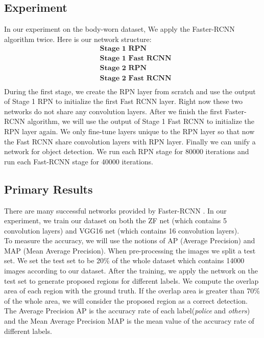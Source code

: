 \documentclass[a4paper]{article}
\begin{document}
\subsection{Experiment}
In our experiment on the body-worn dataset, We apply the Faster-RCNN \cite{fasterrcnn} algorithm twice. Here is our network structure:
\begin{align*}
& \textbf{Stage 1 RPN}\\
& \textbf{Stage 1 Fast RCNN}\\
&\textbf{Stage 2 RPN}\\
& \textbf{Stage 2 Fast RCNN}\\
\end{align*}
During the first stage, we create the RPN layer from scratch and use the output of Stage 1 RPN to initialize the first Fast RCNN layer. Right now these two networks do not share any convolution layers. After we finish the first Faster-RCNN algorithm, we will use the output of Stage 1 Fast RCNN to initialize the RPN layer again. We only fine-tune layers unique to the RPN layer so that now the Fast RCNN share convolution layers with RPN layer. Finally we can unify a network for object detection. We run each RPN stage for 80000 iterations and run each Fast-RCNN stage for 40000 iterations.

\subsection{Primary Results}\label{subsec:primary_result}
There are many successful networks provided by Faster-RCNN \cite{fasterrcnn}. In our experiment, we train our dataset on both the ZF net (which contains 5 convolution layers) and VGG16 net (which contains 16 convolution layers).\\

To measure the accuracy, we will use the notions of AP (Average Precision) and MAP (Mean Average Precision). When pre-processing the images we split a test set. We set the test set to be 20\% of the whole dataset which contains 14000 images according to our dataset. After the training, we apply the network on the test set to generate proposed regions for different labels. We compute the overlap area of each region with the ground truth. If the overlap area is greater than 70\% of the whole area, we will consider the proposed region as a correct detection. The Average Precision AP is the accuracy rate of each label(\textit{police} and \textit{others}) and the Mean Average Precision MAP is the mean value of the accuracy rate of different labels.\\
\end{document}
